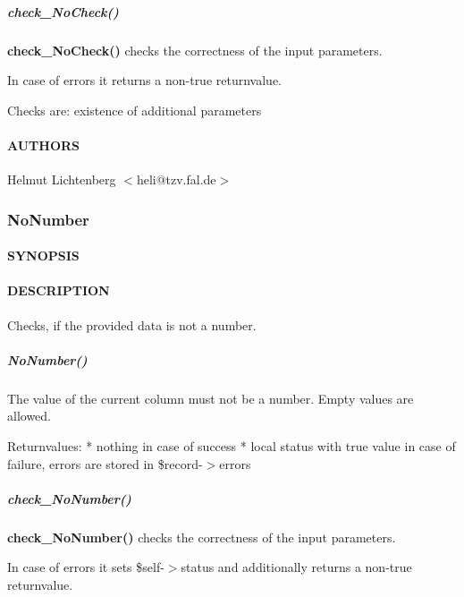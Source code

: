 \subparagraph*{check\_NoCheck()\label{NoCheck_check_NoCheck_}}


\textbf{check\_NoCheck()} checks the correctness of the input parameters.



In case of errors it returns a non-true returnvalue.



Checks are:
   existence of additional parameters

\paragraph*{AUTHORS\label{NoCheck_AUTHORS}}


Helmut Lichtenberg $<$heli@tzv.fal.de$>$

\subsubsection{NoNumber\label{NoNumber}}




\paragraph*{SYNOPSIS\label{NoNumber_SYNOPSIS}}
\paragraph*{DESCRIPTION\label{NoNumber_DESCRIPTION}}


Checks, if the provided data is not a number.

\subparagraph*{NoNumber()\label{NoNumber_NoNumber_}}


The value of the current column must not be a number.  Empty values are
allowed.



Returnvalues:
   * nothing in case of success
   * local status with true value in case of failure, errors are stored in
     \$record-$>$errors

\subparagraph*{check\_NoNumber()\label{NoNumber_check_NoNumber_}}


\textbf{check\_NoNumber()} checks the correctness of the input parameters.



In case of errors it sets \$self-$>$status and additionally returns a non-true
returnvalue.



